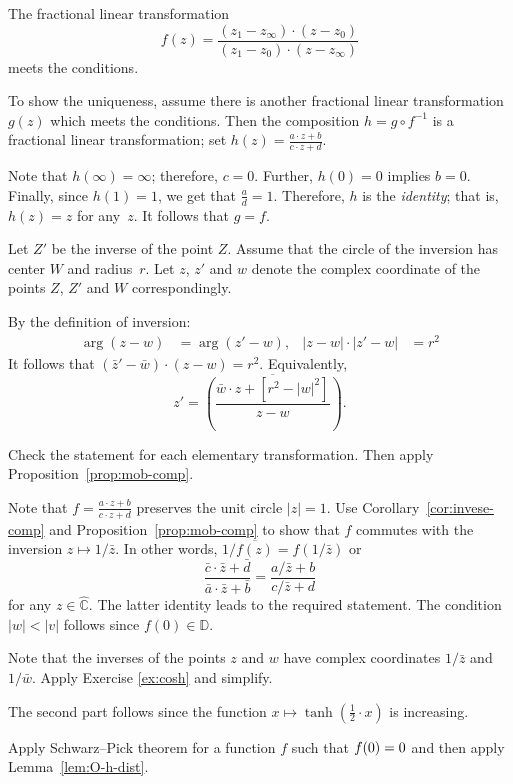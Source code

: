 The fractional linear transformation
\[f(z)=\frac{(z_1-z_\infty)\cdot(z-z_0)}{(z_1-z_0)\cdot(z-z_\infty)}\]
meets the conditions.

To show the uniqueness, assume there is another fractional linear transformation
$g(z)$ which meets the conditions.
Then the composition
$h=g\circ f^{-1}$ 
is a fractional linear transformation; set
$h(z)=\tfrac{a\cdot z+b}{c\cdot z+d}$.

Note that $h(\infty)=\infty$;
therefore, $c=0$.
Further, $h(0)=0$ implies $b=0$.
Finally, since $h(1)=1$, we get that $\tfrac ad=1$.
Therefore, $h$ is the \emph{identity};
that is, $h(z)=z$ for any~$z$.
It follows that $g=f$.

Let $Z'$ be the inverse of the point $Z$.
Assume that the circle of the inversion has center $W$ and radius~$r$.
Let $z$, $z'$ and $w$ denote the complex coordinate of the points $Z$, $Z'$ and $W$ correspondingly.

By the definition of inversion:
\begin{align*}
\arg (z-w)&=\arg (z'-w),
&
|z-w|\cdot|z'-w|&=r^2
\end{align*}
It follows that $(\bar z'-\bar w)\cdot ( z- w)= r^2$.
Equivalently,
\[z'=\overline{\left(\frac{\bar w\cdot z+[r^2-|w|^2]}{z- w}\right)}.\]

 
Check the statement for each elementary transformation.
Then apply Proposition~\ref{prop:mob-comp}.

Note that $f=\tfrac{a\cdot z+b}{c\cdot z+d}$ preserves the unit circle $|z|=1$.
Use Corollary~\ref{cor:invese-comp} and Proposition~\ref{prop:mob-comp} to show that $f$ commutes with the inversion $z\mapsto 1/\bar z$.
In other words, $1/\overline{f(z)}=f(1/\bar z)$ or
\[\frac{\bar c\cdot \bar z+\bar d}{\bar a\cdot \bar z+\bar b}
=\frac{a/\bar z+b}{c/\bar z+d}\]
for any $z\in\hat{\mathbb{C}}$.
The latter identity leads to the required statement. 
The condition $|w|<|v|$ follows since $f(0)\in\mathbb{D}$.

Note that the inverses of the points $z$ and $w$ have complex coordinates $1/\bar z$ and $1/\bar w$.
Apply Exercise \ref{ex:cosh} and simplify.

The second part follows since the function $x\mapsto \tanh(\tfrac12\cdot x)$ is increasing.

Apply Schwarz--Pick theorem for a function $f$ such that $f(0)\z=0$ and then apply Lemma~\ref{lem:O-h-dist}.

